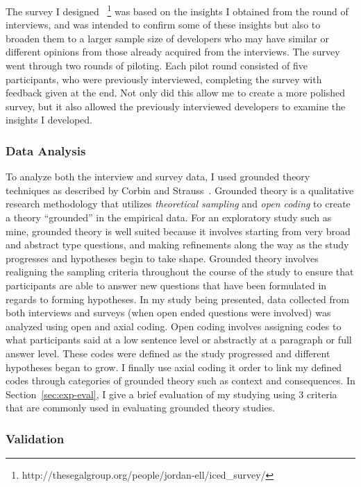 The survey I designed ~\footnote{http://thesegalgroup.org/people/jordan-ell/iced\_survey/}
was based on the insights I obtained from the round of interviews, and was intended to confirm some of these insights but also to broaden them to a larger sample size of developers who may have similar
or different opinions from those already acquired from the interviews. The survey went through two rounds of
piloting. Each pilot round consisted of five participants, who were previously interviewed, completing the survey
with feedback given at the end. Not only did this allow me to create a more polished survey, but it also allowed 
the previously interviewed developers to examine the insights I developed.

\subsubsection{Data Analysis}
To analyze both the interview and survey data, I used grounded theory techniques as described by Corbin and Strauss~\cite{Corbin:1998:SP}.
Grounded theory is a qualitative research methodology that utilizes \textit{theoretical sampling} and
\textit{open coding} to create a theory ``grounded'' in the empirical data. For an exploratory study such as
mine, grounded theory is well suited because it involves starting from very broad and abstract type questions, and
making refinements along the way as the study progresses and hypotheses begin to take shape. Grounded theory involves
realigning the sampling criteria throughout the course of the study to ensure that participants are able to answer new
questions that have been formulated in regards to forming hypotheses. In my study being presented, data collected from
both interviews and surveys (when open ended questions were involved) was analyzed using open and axial coding. Open coding involves
assigning codes to what participants said at a low sentence level or abstractly at a paragraph or full answer level. These
codes were defined as the study progressed and different hypotheses began to grow. I finally use axial coding it order to
link my defined codes through categories of grounded theory such as context and consequences. 
In Section~\ref{sec:exp-eval}, I give a brief evaluation of my studying using 
3 criteria that are commonly used in evaluating grounded theory studies.

\subsubsection{Validation}

